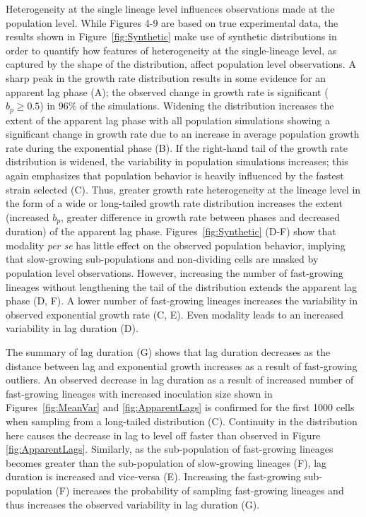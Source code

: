 \documentclass{bioinfo}
\begin{document}
Heterogeneity at the single lineage level influences observations made at the population level. While Figures 4-9 are based on true experimental data, the results shown in Figure~\ref{fig:Synthetic} make use of synthetic distributions in order to quantify how features of heterogeneity at the single-lineage level, as captured by the shape of the distribution, affect population level observations. A sharp peak in the growth rate distribution results in some evidence for an apparent lag phase (A); the observed change in growth rate is significant ($b_p\geq 0.5$) in 96\% of the simulations. Widening the distribution increases the extent of the apparent lag phase with all population simulations showing a significant change in growth rate due to an increase in average population growth rate during the exponential phase (B). If the right-hand tail of the growth rate distribution is widened, the variability in population simulations increases; this again emphasizes that population behavior is heavily influenced by the fastest strain selected (C). Thus, greater growth rate heterogeneity at the lineage level in the form of a wide or long-tailed growth rate distribution increases the extent (increased $b_p$, greater difference in growth rate between phases and decreased duration) of the apparent lag phase. Figures~\ref{fig:Synthetic} (D-F) show that modality \textit{per se} has little effect on the observed population behavior, implying that slow-growing sub-populations and non-dividing cells are masked by population level observations. However, increasing the number of fast-growing lineages without lengthening the tail of the distribution extends the apparent lag phase (D, F). A lower number of fast-growing lineages increases the variability in observed exponential growth rate (C, E). Even modality leads to an increased variability in lag duration (D). 

The summary of lag duration (G) shows that lag duration decreases as the distance between lag and exponential growth increases as a result of fast-growing outliers. An observed decrease in lag duration as a result of increased number of fast-growing lineages with increased inoculation size shown in Figures~\ref{fig:MeanVar} and \ref{fig:ApparentLags} is confirmed for the first 1000 cells when sampling from a long-tailed distribution (C). Continuity in the distribution here causes the decrease in lag to level off faster than observed in Figure \ref{fig:ApparentLags}. Similarly, as the sub-population of fast-growing lineages becomes greater than the sub-population of slow-growing lineages (F), lag duration is increased and vice-versa (E). Increasing the fast-growing sub-population (F) increases the probability of sampling fast-growing lineages and thus increases the observed variability in lag duration (G). 
\end{document}
